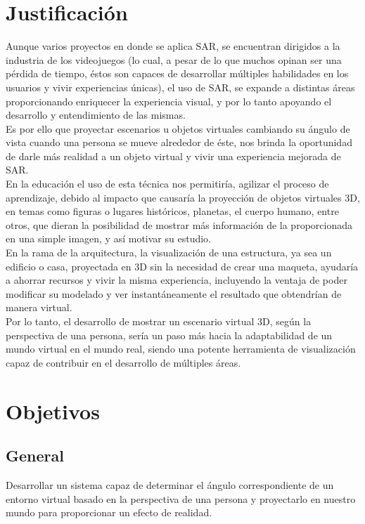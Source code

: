 \documentclass[a4paper,openright,12pt]{report}
\begin{document}
\section{Justificación}
Aunque varios proyectos en donde se aplica SAR, se encuentran dirigidos a la industria de los videojuegos (lo cual, a pesar de lo que muchos opinan ser una pérdida de tiempo, éstos son capaces de desarrollar múltiples habilidades en los usuarios y vivir experiencias únicas), el uso de SAR, se expande a distintas áreas proporcionando enriquecer la experiencia visual, y por lo tanto apoyando el desarrollo y entendimiento de las mismas.\\
Es por ello que proyectar escenarios u objetos virtuales cambiando su ángulo de vista cuando una persona se mueve alrededor de éste, nos brinda la oportunidad de darle más realidad a un objeto virtual y vivir una experiencia mejorada de SAR.\\
En la educación el uso de esta técnica nos permitiría, agilizar el proceso de aprendizaje, debido al impacto que causaría la proyección de objetos virtuales 3D, en temas como figuras o lugares históricos, planetas, el cuerpo humano, entre otros, que dieran la posibilidad de mostrar más información de la proporcionada en una simple imagen, y así motivar su estudio.\\
En la rama de la arquitectura, la visualización de una estructura, ya sea un edificio o casa, proyectada en 3D sin la necesidad de crear una maqueta, ayudaría a ahorrar recursos y vivir la misma experiencia, incluyendo la ventaja de poder modificar su modelado y ver instantáneamente el resultado que obtendrían de manera virtual.\\
Por lo tanto, el desarrollo de mostrar un escenario virtual 3D, según la perspectiva de una persona, sería un paso más hacia la adaptabilidad de un mundo virtual en el mundo real, siendo una potente herramienta de visualización capaz de contribuir en el desarrollo de múltiples áreas.

\section{Objetivos}
\subsection{General}
Desarrollar un sistema capaz de determinar el ángulo correspondiente de un entorno virtual basado en la perspectiva de una persona y proyectarlo en nuestro mundo para proporcionar un efecto de realidad.
%
\end{document}

